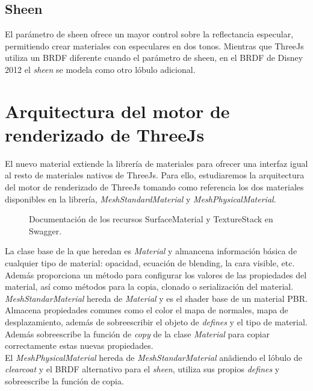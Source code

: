   \subsection{Sheen}
  El par\'ametro de sheen ofrece un mayor control sobre la reflectancia especular, permitiendo crear materiales con
  especulares en dos tonos. Mientras que ThreeJs utiliza un BRDF diferente cuando el par\'ametro de sheen, en el
  BRDF de Disney 2012 el \textit{sheen} se modela como otro l\'obulo adicional.\\

\section{Arquitectura del motor de renderizado de ThreeJs}
El nuevo material extiende la librer\'ia de materiales para ofrecer una interfaz igual al resto de materiales nativos
de ThreeJs. Para ello, estudiaremos la arquitectura del motor de renderizado de ThreeJs tomando como referencia los dos
materiales disponibles en la librer\'ia, \textit{MeshStandardMaterial} y \textit{MeshPhysicalMaterial}.

\begin{figure}[H]
  \centering
  \caption{Documentaci\'on de los recursos SurfaceMaterial y TextureStack en Swagger.}
  \vspace{0.5cm}
\end{figure}

La clase base de la que heredan es \textit{Material} y almancena informaci\'on b\'asica de
cualquier tipo de material: opacidad, ecuaci\'on de blending, la cara visible, etc. Adem\'as proporciona un m\'etodo
para configurar los valores de las propiedades del material, as\'i como m\'etodos para la copia, clonado o serializaci\'on
del material.\\

\textit{MeshStandarMaterial} hereda de \textit{Material} y es el shader base de un material PBR. Almacena propiedades comunes
como el color el mapa de normales, mapa de desplazamiento, adem\'as de sobreescribir el objeto de \textit{defines} y el tipo
de material. Adem\'as sobreescribe la funci\'on de \textit{copy} de la clase \textit{Material} para copiar correctamente
estas nuevas propiedades.\\

El \textit{MeshPhysicalMaterial} hereda de \textit{MeshStandarMaterial} an\~adiendo el l\'obulo de \textit{clearcoat} y
el BRDF alternativo para el \textit{sheen}, utiliza sus propios \textit{defines} y sobreescribe la funci\'on de copia.\\


